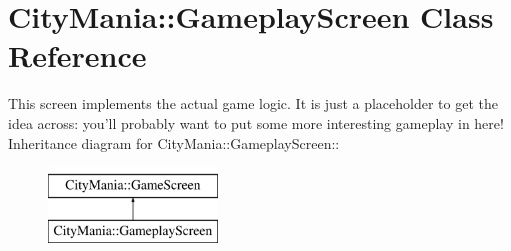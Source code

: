 \hypertarget{classCityMania_1_1GameplayScreen}{
\section{CityMania::GameplayScreen Class Reference}
\label{classCityMania_1_1GameplayScreen}
}


This screen implements the actual game logic. It is just a placeholder to get the idea across: you'll probably want to put some more interesting gameplay in here!  
Inheritance diagram for CityMania::GameplayScreen::\begin{figure}[H]
\begin{center}
\leavevmode
\includegraphics[height=2cm]{classCityMania_1_1GameplayScreen}
\end{center}
\end{figure}
